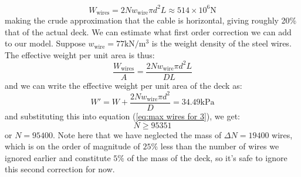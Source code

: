\documentclass{article}
\begin{document}
\begin{equation}
    W_\text{wires}= 2Nw_\text{wire}\pi d^2 L \approx 514 \times 10^6 \si{\newton}
    \label{eq:}
\end{equation}
making the crude approximation that the cable is horizontal, giving roughly 20\% that of the actual deck. We can estimate what first order correction we can add to our model. Suppose $w_\text{wire}=77\si{\kilo\newton\per\meter\cubed}$ is the weight density of the steel wires. The effective weight per unit area is thus:
\begin{equation}
    \frac{W_\text{wires}}{A} = \frac{2Nw_\text{wire}\pi d^2L}{DL}
    \label{eq:}
\end{equation}
and we can write the effective weight per unit area of the deck as:
\begin{equation}
    W' = W + \frac{2Nw_\text{wire}\pi d^2}{D} = 34.49\si{\kilo\pascal}
    \label{eq:adjusted pressure}
\end{equation}
and substituting this into equation (\ref{eq:max wires for 3}), we get:
\begin{equation}
    N \ge 95351
    \label{eq:}
\end{equation}
or $N=95400$. Note here that we have neglected the mass of $\Delta N = 19400$ wires, which is on the order of magnitude of $25\%$ less than the number of wires we ignored earlier and constitute $5\%$ of the mass of the deck, so it's safe to ignore this second correction for now.
\vspace{2mm}
\end{document}
